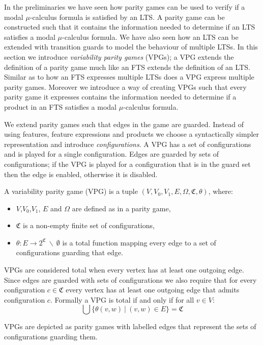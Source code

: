 In the preliminaries we have seen how parity games can be used to verify if a modal $\mu$-calculus formula is satisfied by an LTS. A parity game can be constructed such that it contains the information needed to determine if an LTS satisfies a  modal $\mu$-calculus formula. We have also seen how an LTS can be extended with transition guards to model the behaviour of multiple LTSs. In this section we introduce \textit{variability parity games} (VPGs); a VPG extends the definition of a parity game much like an FTS extends the definition of an LTS. Similar as to how an FTS expresses multiple LTSs does a VPG express multiple parity games. Moreover we introduce a way of creating VPGs such that every parity game it expresses contains the information needed to determine if a product in an FTS satisfies a modal $\mu$-calculus formula.

We extend parity games such that edges in the game are guarded. Instead of using features, feature expressions and products we choose a syntactically simpler representation and introduce \textit{configurations}. A VPG has a set of configurations and is played for a single configuration. Edges are guarded by sets of configurations; if the VPG is played for a configuration that is in the guard set then the edge is enabled, otherwise it is disabled.

\begin{definition}
	\label{def_VPG}
	A variability parity game (VPG) is a tuple $(V,V_0, V_1, E, \Omega, \mathfrak{C}, \theta)$, where:
	\begin{itemize}
		\item $V$,$V_0$,$V_1$, $E$ and $\Omega$ are defined as in a parity game,
		\item $\mathfrak{C}$ is a non-empty finite set of configurations,
		\item $\theta : E \rightarrow 2^\mathfrak{C}\ \backslash\ \emptyset$ is a total function mapping every edge to a set of configurations guarding that edge.
	\end{itemize}
\end{definition}
VPGs are considered total when every vertex has at least one outgoing edge. Since edges are guarded with sets of configurations we also require that for every configuration $c \in \mathfrak{C}$ every vertex has at least one outgoing edge that admits configuration $c$. Formally a VPG is total if and only if for all $v \in V$:
\[ \bigcup\{\theta(v,w)\ |\ (v,w) \in E\} = \mathfrak{C} \]

VPGs are depicted as parity games with labelled edges that represent the sets of configurations guarding them.

